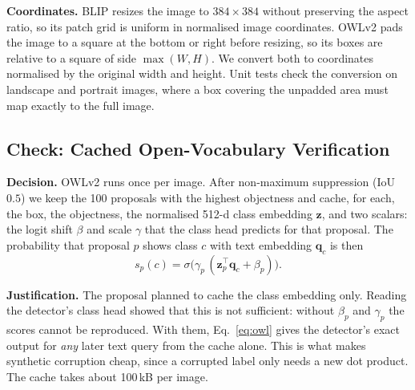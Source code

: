 \textbf{Coordinates.} BLIP resizes the image to $384\times384$ without preserving the aspect ratio, so its patch grid is uniform in normalised image coordinates. OWLv2 pads the image to a square at the bottom or right before resizing, so its boxes are relative to a square of side $\max(W,H)$. We convert both to coordinates normalised by the original width and height. Unit tests check the conversion on landscape and portrait images, where a box covering the unpadded area must map exactly to the full image.

\subsection{Check: Cached Open-Vocabulary Verification}
\label{sec:design-check}
\textbf{Decision.} OWLv2 runs once per image. After non-maximum suppression (IoU $0.5$) we keep the 100 proposals with the highest objectness and cache, for each, the box, the objectness, the normalised 512-d class embedding $\mathbf{z}$, and two scalars: the logit shift $\beta$ and scale $\gamma$ that the class head predicts for that proposal. The probability that proposal $p$ shows class $c$ with text embedding $\mathbf{q}_c$ is then
\begin{equation}
s_p(c)=\sigma\!\big(\gamma_p\,(\mathbf{z}_p^{\top}\mathbf{q}_c+\beta_p)\big).
\label{eq:owl}
\end{equation}

\textbf{Justification.} The proposal planned to cache the class embedding only. Reading the detector's class head showed that this is not sufficient: without $\beta_p$ and $\gamma_p$ the scores cannot be reproduced. With them, Eq.~\eqref{eq:owl} gives the detector's exact output for \emph{any} later text query from the cache alone. This is what makes synthetic corruption cheap, since a corrupted label only needs a new dot product. The cache takes about 100\,kB per image.

